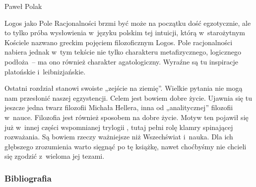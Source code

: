\begin{recplenv}{Paweł Polak}

Logos jako Pole Racjonalności brzmi być może na początku dość egzotycznie, ale to tylko próba wysłowienia w~języku
polskim tej intuicji, którą w~starożytnym Kościele nazwano greckim pojęciem filozoficznym Logos. Pole racjonalności
nabiera jednak w~tym tekście nie tylko charakteru metafizycznego, logicznego podłoża~-- ma ono również charakter
agatologiczny. Wyraźne są tu inspiracje platońskie i~lei\-bnizjańskie.


Ostatni rozdział stanowi swoiste „zejście na ziemię”. Wielkie pytania nie mogą nam przesłonić naszej egzystencji.
Celem jest bowiem dobre życie. Ujawnia się tu jeszcze jedna twarz filozofii Michała Hellera, inna od „analitycznej”
filozofii w~nauce. Filozofia jest również sposobem na dobre życie. Motyw ten pojawił się już w~innej części wspomnianej
trylogii
\parencite{heller_jak_2009},
tutaj pełni rolę klamry spinającej rozważania. Są bowiem rzeczy ważniejsze niż Wszechświat i~nauka.
Dla ich głębszego zrozumienia warto sięgnąć po tę książkę, nawet choćbyśmy nie chcieli się zgodzić z~wieloma jej
tezami.




\subsubsection{Bibliografia}\nopagebreak[4]
\end{recplenv}
